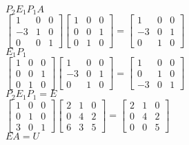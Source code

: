 \documentclass{article}
\renewcommand{\(}{\left(}
\renewcommand{\)}{\right)}
\theoremstyle{plain}
\theoremstyle{plain}
\theoremstyle{definition}
\begin{document}
\begin{enumerate}[label*=\arabic*.,ref=\arabic*]
\begin{shaded}
$P_2E_1P_1A$ \\

$\begin{bmatrix} 1 & 0 & 0 \\ -3 & 1 & 0 \\ 0 & 0 & 1 \end{bmatrix} \begin{bmatrix} 1 & 0 & 0 \\ 0 & 0 & 1 \\ 0 & 1 & 0 \end{bmatrix} = \begin{bmatrix} 1 & 0 & 0 \\ -3 & 0 & 1 \\ 0 & 1 & 0 \end{bmatrix}$ \\

$E_1P_1$ \\

$\begin{bmatrix} 1 & 0 & 0 \\ 0 & 0 & 1 \\ 0 & 1 & 0 \end{bmatrix} \begin{bmatrix} 1 & 0 & 0 \\ -3 & 0 & 1 \\ 0 & 1 & 0 \end{bmatrix} = \begin{bmatrix} 1 & 0 & 0 \\ 0 & 1 & 0 \\ -3 & 0 & 1 \end{bmatrix}$ \\

$P_2E_1P_1 = E$ \\

$\begin{bmatrix} 1 & 0 & 0 \\ 0 & 1 & 0 \\ 3 & 0 & 1 \end{bmatrix} \begin{bmatrix} 2 & 1 & 0 \\ 0 & 4 & 2 \\ 6 & 3 & 5 \end{bmatrix} = \begin{bmatrix} 2 & 1 & 0 \\ 0 & 4 & 2 \\ 0 & 0 & 5 \end{bmatrix}$ \\

$EA = U$ \\


\end{shaded}
\end{enumerate}
\end{document}
